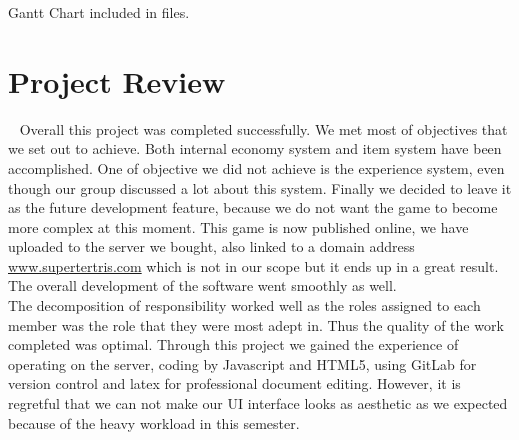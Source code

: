 \documentclass[12pt]{article}
\newcommand\tab[1][1cm]{\hspace*{#1}}
\begin{document}
Gantt Chart included in files.


\newpage
\section{Project Review}
~\newline
\tab Overall this project was completed successfully. We met most of objectives that we set out to achieve. Both internal economy system and item system have been accomplished. One of objective we did not achieve is the experience system, even though our group discussed a lot about this system. Finally we decided to leave it as the future development feature, because we do not want the game to become more complex at this moment. This game is now published online, we have uploaded to the server we bought, also linked to a domain address \url{www.supertertris.com} which is not in our scope but it ends up in a great result. The overall development of the software went smoothly as well. \\
\tab The decomposition of responsibility worked well as the roles assigned to each member was the role that they were most adept in. Thus the quality of the work completed was optimal. Through this project we gained the experience of operating on the server, coding by Javascript and HTML5, using GitLab for version control and latex for professional document editing. However, it is regretful that we can not make our UI interface looks as aesthetic as we expected because of the heavy workload in this semester. 
\end{document}
